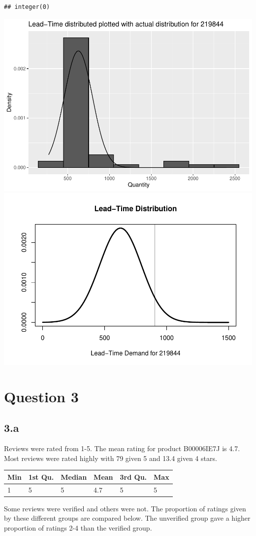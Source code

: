 \documentclass[
  11pt,
]{article}
\begin{document}
\begin{verbatim}
## integer(0)
\end{verbatim}

\includegraphics[width=0.5\linewidth]{Assignment-STAT702---final_files/figure-latex/actual distribution plot, figures-side-1}
\includegraphics[width=0.5\linewidth]{Assignment-STAT702---final_files/figure-latex/actual distribution plot, figures-side-2}

\hypertarget{question-3}{%
\section{Question 3}\label{question-3}}

\hypertarget{a-1}{%
\subsection{3.a}\label{a-1}}

Reviews were rated from 1-5. The mean rating for product B00006IE7J is
4.7. Most reviews were rated highly with 79 given 5 and 13.4 given 4
stars.

\begin{longtable}[]{@{}llllll@{}}
\toprule
Min & 1st Qu. & Median & Mean & 3rd Qu. & Max \\
\midrule
\endhead
1 & 5 & 5 & 4.7 & 5 & 5 \\
\bottomrule
\end{longtable}

Some reviews were verified and others were not. The proportion of
ratings given by these different groups are compared below. The
unverified group gave a higher proportion of ratings 2-4 than the
verified group.
\end{document}
